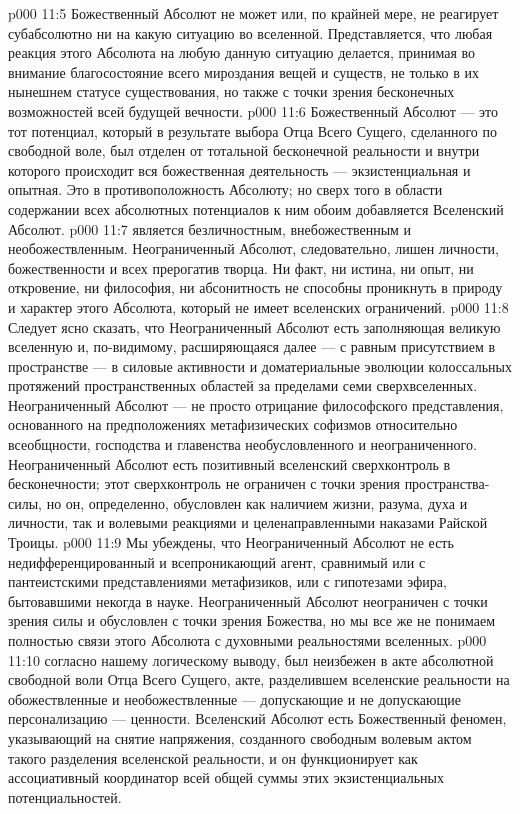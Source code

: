 \vs p000 11:5 Божественный Абсолют не может или, по крайней мере, не реагирует субабсолютно ни на какую ситуацию во вселенной. Представляется, что любая реакция этого Абсолюта на любую данную ситуацию делается, принимая во внимание благосостояние всего мироздания вещей и существ, не только в их нынешнем статусе существования, но также с точки зрения бесконечных возможностей всей будущей вечности.
\vs p000 11:6 Божественный Абсолют --- это тот потенциал, который в результате выбора Отца Всего Сущего, сделанного по свободной воле, был отделен от тотальной бесконечной реальности и внутри которого происходит вся божественная деятельность --- экзистенциальная и опытная. Это  в противоположность  Абсолюту; но сверх того в области содержании всех абсолютных потенциалов к ним обоим добавляется Вселенский Абсолют.
\vs p000 11:7 \bibnobreakspace {} является безличностным, внебожественным и необожествленным. Неограниченный Абсолют, следовательно, лишен личности, божественности и всех прерогатив творца. Ни факт, ни истина, ни опыт, ни откровение, ни философия, ни абсонитность не способны проникнуть в природу и характер этого Абсолюта, который не имеет вселенских ограничений.
\vs p000 11:8 Следует ясно сказать, что Неограниченный Абсолют есть  заполняющая великую вселенную и, по\hyp{}видимому, расширяющаяся далее --- с равным присутствием в пространстве --- в силовые активности и доматериальные эволюции колоссальных протяжений пространственных областей за пределами семи сверхвселенных. Неограниченный Абсолют --- не просто отрицание философского представления, основанного на предположениях метафизических софизмов относительно всеобщности, господства и главенства необусловленного и неограниченного. Неограниченный Абсолют есть позитивный вселенский сверхконтроль в бесконечности; этот сверхконтроль не ограничен с точки зрения пространства\hyp{}силы, но он, определенно, обусловлен как наличием жизни, разума, духа и личности, так и волевыми реакциями и целенаправленными наказами Райской Троицы.
\vs p000 11:9 Мы убеждены, что Неограниченный Абсолют не есть недифференцированный и всепроникающий агент, сравнимый или с пантеистскими представлениями метафизиков, или с гипотезами эфира, бытовавшими некогда в науке. Неограниченный Абсолют неограничен с точки зрения силы и обусловлен с точки зрения Божества, но мы все же не понимаем полностью связи этого Абсолюта с духовными реальностями вселенных.
\vs p000 11:10 \bibnobreakspace {} согласно нашему логическому выводу, был неизбежен в акте абсолютной свободной воли Отца Всего Сущего, акте, разделившем вселенские реальности на обожествленные и необожествленные --- допускающие и не допускающие персонализацию --- ценности. Вселенский Абсолют есть Божественный феномен, указывающий на снятие напряжения, созданного свободным волевым актом такого разделения вселенской реальности, и он функционирует как ассоциативный координатор всей общей суммы этих экзистенциальных потенциальностей.
